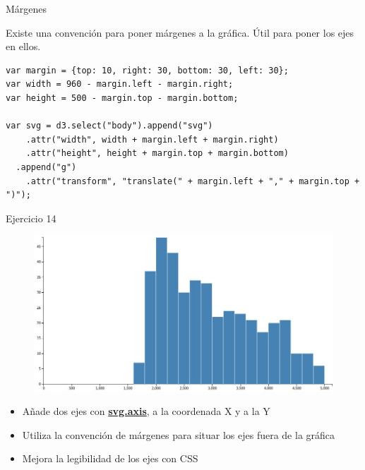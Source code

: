 \documentclass[ignorenonframetext,]{beamer}
\makeatletter
\def\ScaleIfNeededW{%
  \ifdim\Gin@nat@width>\linewidth
    \linewidth
  \else
    \Gin@nat@width
  \fi
}
\def\ScaleIfNeededH{%
  \ifdim\Gin@nat@height>0.6\textheight
    0.6\textheight
  \else
    \Gin@nat@height
  \fi
}
\let\Oldincludegraphics\includegraphics
\renewcommand{\includegraphics}[2][]{\Oldincludegraphics[width=\ScaleIfNeededW, height=\ScaleIfNeededH,keepaspectratio]{#2}}
\makeatother
\begin{document}
\begin{frame}[fragile]{Márgenes}

Existe una convención para poner márgenes a la gráfica. Útil para poner
los ejes en ellos.

\begin{lstlisting}
var margin = {top: 10, right: 30, bottom: 30, left: 30};
var width = 960 - margin.left - margin.right;
var height = 500 - margin.top - margin.bottom;

var svg = d3.select("body").append("svg")
    .attr("width", width + margin.left + margin.right)
    .attr("height", height + margin.top + margin.bottom)
  .append("g")
    .attr("transform", "translate(" + margin.left + "," + margin.top + ")");
\end{lstlisting}

\end{frame}

\begin{frame}{Ejercicio 14}

\begin{figure}[htbp]
\centering
\includegraphics{../rsc/images/ej14.jpg}
\end{figure}

\end{frame}

\begin{frame}

\begin{itemize}
\itemsep1pt\parskip0pt
\item
  Añade dos ejes con
  \textbf{\href{https://github.com/mbostock/d3/wiki/SVG-Axes}{svg.axis}},
  a la coordenada X y a la Y
\item
  Utiliza la convención de márgenes para situar los ejes fuera de la
  gráfica
\item
  Mejora la legibilidad de los ejes con CSS
\end{itemize}

\end{frame}
\end{document}
